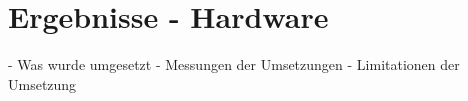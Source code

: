 
\chapter{Ergebnisse - Hardware} \label{ergebnisse}

\nocite{*}
- Was wurde umgesetzt
- Messungen der Umsetzungen
- Limitationen der Umsetzung
